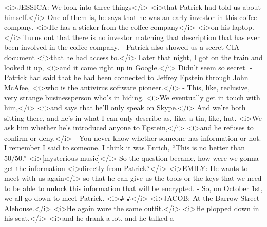 \begin{itemize}
  \textless{}i\textgreater{}JESSICA: We look into three
  things\textless{}/i\textgreater{} \textless{}i\textgreater{}that
  Patrick had told us about himself.\textless{}/i\textgreater{} One of
  them is, he says that he was an early investor in this coffee company.
  \textless{}i\textgreater{}He has a sticker from the coffee
  company\textless{}/i\textgreater{} \textless{}i\textgreater{}on his
  laptop.\textless{}/i\textgreater{} Turns out that there is no investor
  matching that description that has ever been involved in the coffee
  company. - Patrick also showed us a secret CIA document
  \textless{}i\textgreater{}that he had access
  to.\textless{}/i\textgreater{} Later that night, I got on the train
  and looked it up, \textless{}i\textgreater{}and it came right up in
  Google.\textless{}/i\textgreater{} Didn't seem so secret. - Patrick
  had said that he had been connected to Jeffrey Epstein through John
  McAfee, \textless{}i\textgreater{}who is the antivirus software
  pioneer.\textless{}/i\textgreater{} - This, like, reclusive, very
  strange businessperson who's in hiding. \textless{}i\textgreater{}We
  eventually get in touch with him,\textless{}/i\textgreater{}
  \textless{}i\textgreater{}and says that he'll only speak on
  Skype.\textless{}/i\textgreater{} And we're both sitting there, and
  he's in what I can only describe as, like, a tin, like, hut.
  \textless{}i\textgreater{}We ask him whether he's introduced anyone to
  Epstein,\textless{}/i\textgreater{} \textless{}i\textgreater{}and he
  refuses to confirm or deny.\textless{}/i\textgreater{} - You never
  know whether someone has information or not. I remember I said to
  someone, I think it was Enrich, ``This is no better than 50/50.''
  \textless{}i\textgreater{}{[}mysterious
  music{]}\textless{}/i\textgreater{} So the question became, how were
  we gonna get the information \textless{}i\textgreater{}directly from
  Patrick?\textless{}/i\textgreater{} \textless{}i\textgreater{}EMILY:
  He wants to meet with us again\textless{}/i\textgreater{} so that he
  can give us the tools or the keys that we need to be able to unlock
  this information that will be encrypted. - So, on October 1st, we all
  go down to meet Patrick. \textless{}i\textgreater{}♪
  ♪\textless{}/i\textgreater{} \textless{}i\textgreater{}JACOB: At the
  Barrow Street Alehouse.\textless{}/i\textgreater{}
  \textless{}i\textgreater{}He again wore the same
  outfit.\textless{}/i\textgreater{} \textless{}i\textgreater{}He
  plopped down in his seat,\textless{}/i\textgreater{}
  \textless{}i\textgreater{}and he drank a lot, and he talked a

\end{itemize}
